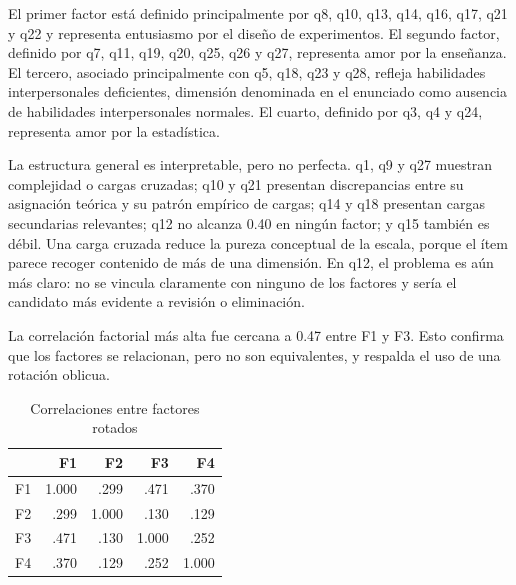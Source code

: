 \documentclass[12pt,letterpaper]{article}
\begin{document}
El primer factor está definido principalmente por q8, q10, q13, q14, q16, q17, q21 y q22 y representa entusiasmo por el diseño de experimentos. El segundo factor, definido por q7, q11, q19, q20, q25, q26 y q27, representa amor por la enseñanza. El tercero, asociado principalmente con q5, q18, q23 y q28, refleja habilidades interpersonales deficientes, dimensión denominada en el enunciado como ausencia de habilidades interpersonales normales. El cuarto, definido por q3, q4 y q24, representa amor por la estadística.

La estructura general es interpretable, pero no perfecta. q1, q9 y q27 muestran complejidad o cargas cruzadas; q10 y q21 presentan discrepancias entre su asignación teórica y su patrón empírico de cargas; q14 y q18 presentan cargas secundarias relevantes; q12 no alcanza 0.40 en ningún factor; y q15 también es débil. Una carga cruzada reduce la pureza conceptual de la escala, porque el ítem parece recoger contenido de más de una dimensión. En q12, el problema es aún más claro: no se vincula claramente con ninguno de los factores y sería el candidato más evidente a revisión o eliminación.

La correlación factorial más alta fue cercana a 0.47 entre F1 y F3. Esto confirma que los factores se relacionan, pero no son equivalentes, y respalda el uso de una rotación oblicua.



\begin{table}[H]
\centering
\caption{Diagnóstico de ítems en la solución factorial}
\label{tab:p2-diagnostico-items}
\end{table}

\begin{table}[H]
\centering
\caption{Correlaciones entre factores rotados}
\label{tab:p2-correlaciones-factores}
\begin{tabular}{lrrrr}
\toprule
 & F1 & F2 & F3 & F4 \\
\midrule
F1 & 1.000 & .299 & .471 & .370 \\
F2 & .299 & 1.000 & .130 & .129 \\
F3 & .471 & .130 & 1.000 & .252 \\
F4 & .370 & .129 & .252 & 1.000 \\
\bottomrule
\end{tabular}
\end{table}
\end{document}
